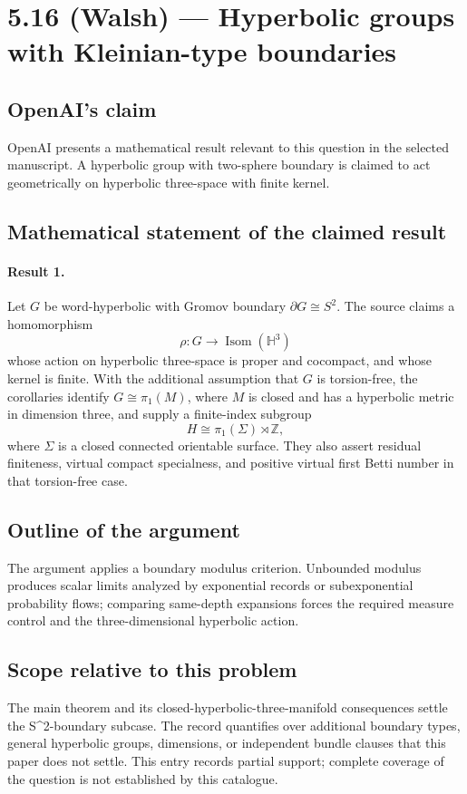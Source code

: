 \documentclass[11pt]{article}
\begin{document}
\section*{5.16 (Walsh) — Hyperbolic groups with Kleinian-type boundaries}

\subsection{OpenAI's claim}
OpenAI presents a mathematical result relevant to this question in the selected manuscript. A hyperbolic group with two-sphere boundary is claimed to act geometrically on hyperbolic three-space with finite kernel.

\subsection{Mathematical statement of the claimed result}
\paragraph{Result 1.} Let \(G\) be word-hyperbolic with Gromov boundary \(\partial G\cong S^2\). The source claims a homomorphism
\[
 \rho:G\longrightarrow\operatorname{Isom}(\mathbb H^3)
\]
whose action on hyperbolic three-space is proper and cocompact, and whose kernel is finite. With the additional assumption that \(G\) is torsion-free, the corollaries identify \(G\cong\pi_1(M)\), where \(M\) is closed and has a hyperbolic metric in dimension three, and supply a finite-index subgroup
\[
 H\cong\pi_1(\Sigma)\rtimes\mathbb Z,
\]
where \(\Sigma\) is a closed connected orientable surface. They also assert residual finiteness, virtual compact specialness, and positive virtual first Betti number in that torsion-free case.

\subsection{Outline of the argument}
The argument applies a boundary modulus criterion. Unbounded modulus produces scalar limits analyzed by exponential records or subexponential probability flows; comparing same-depth expansions forces the required measure control and the three-dimensional hyperbolic action.

\subsection{Scope relative to this problem}
The main theorem and its closed-hyperbolic-three-manifold consequences settle the S\textasciicircum{}2-boundary subcase. The record quantifies over additional boundary types, general hyperbolic groups, dimensions, or independent bundle clauses that this paper does not settle. This entry records partial support; complete coverage of the question is not established by this catalogue.
\end{document}
